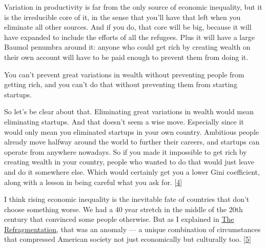 Variation
                  in productivity is far from the only source of economic
                  inequality, but it is the irreducible core of it, in the sense
                  that you'll have that left when you eliminate all other
                  sources. And if you do, that core will be big, because it will
                  have expanded to include the efforts of all the refugees. Plus
                  it will have a large Baumol penumbra around it: anyone who
                  could get rich by creating wealth on their own account will
                  have to be paid enough to prevent them from doing it.

You
                  can't prevent great variations in wealth without preventing
                  people from getting rich, and you can't do that without
                  preventing them from starting startups.

So let's be
                  clear about that. Eliminating great variations in wealth would
                  mean eliminating startups. And that doesn't seem a wise move.
                  Especially since it would only mean you eliminated startups in
                  your own country. Ambitious people already move halfway around
                  the world to further their careers, and startups can operate
                  from anywhere nowadays. So if you made it impossible to get
                  rich by creating wealth in your country, people who wanted to
                  do that would just leave and do it somewhere else. Which would
                  certainly get you a lower Gini coefficient, along with a
                  lesson in being careful what you ask for.
                  [\href{\#f4n}{4}]

I think rising economic inequality is the
                  inevitable fate of countries that don't choose something
                  worse. We had a 40 year stretch in the middle of the 20th
                  century that convinced some people otherwise. But as I
                  explained in \href{http://www.paulgraham.com/re.html}{\underline{The Refragmentation}}, that was an anomaly --- a unique combination of
                  circumstances that compressed American society not just
                  economically but culturally too.
                  [\href{\#f5n}{5}]

